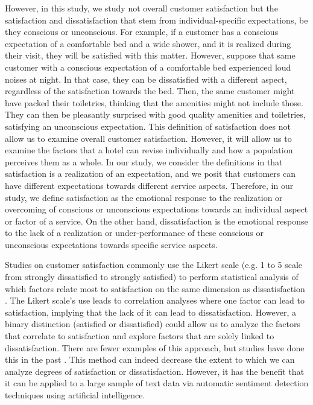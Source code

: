 \documentclass[smallextended,natbib]{svjour3}       %
\begin{document}
    However, in this study, we study not overall customer satisfaction but the satisfaction and dissatisfaction that stem from individual-specific expectations, be they conscious or unconscious. For example, if a customer has a conscious expectation of a comfortable bed and a wide shower, and it is realized during their visit, they will be satisfied with this matter. However, suppose that same customer with a conscious expectation of a comfortable bed experienced loud noises at night. In that case, they can be dissatisfied with a different aspect, regardless of the satisfaction towards the bed. Then, the same customer might have packed their toiletries, thinking that the amenities might not include those. They can then be pleasantly surprised with good quality amenities and toiletries, satisfying an unconscious expectation. This definition of satisfaction does not allow us to examine overall customer satisfaction. However, it will allow us to examine the factors that a hotel can revise individually and how a population perceives them as a whole. In our study, we consider the definitions in \cite{hunt1975} that satisfaction is a realization of an expectation, and we posit that customers can have different expectations towards different service aspects. Therefore, in our study, we define satisfaction as the emotional response to the realization or overcoming of conscious or unconscious expectations towards an individual aspect or factor of a service. On the other hand, dissatisfaction is the emotional response to the lack of a realization or under-performance of these conscious or unconscious expectations towards specific service aspects.

    Studies on customer satisfaction \cite[e.g.][]{truong2009, romao2014, wu2009} commonly use the Likert scale \cite[][]{likert1932technique} (e.g. 1 to 5 scale from strongly dissatisfied to strongly satisfied) to perform statistical analysis of which factors relate most to satisfaction on the same dimension as dissatisfaction \cite[e.g.][]{chan201518, choi2000}. The Likert scale's use leads to correlation analyses where one factor can lead to satisfaction, implying that the lack of it can lead to dissatisfaction. However, a binary distinction (satisfied or dissatisfied) could allow us to analyze the factors that correlate to satisfaction and explore factors that are solely linked to dissatisfaction. There are fewer examples of this approach, but studies have done this in the past \cite[e.g.][]{zhou2014}. This method can indeed decrease the extent to which we can analyze degrees of satisfaction or dissatisfaction. However, it has the benefit that it can be applied to a large sample of text data via automatic sentiment detection techniques using artificial intelligence. 
\end{document}
